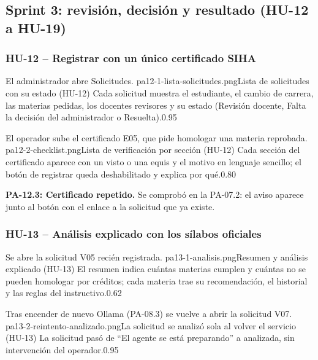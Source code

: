 \clearpage
\subsection{Sprint 3: revisión, decisión y resultado (HU-12 a HU-19)}

\subsubsection{HU-12 -- Registrar con un único certificado SIHA}

{El administrador abre Solicitudes.}
{pa12-1-lista-solicitudes.png}{Lista de solicitudes con su estado (HU-12)}
{Cada solicitud muestra el estudiante, el cambio de carrera, las materias pedidas, los docentes revisores y su estado
(Revisión docente, Falta la decisión del administrador o Resuelta).}{0.95}

{El operador sube el certificado E05, que pide homologar una materia reprobada.}
{pa12-2-checklist.png}{Lista de verificación por sección (HU-12)}
{Cada sección del certificado aparece con un visto o una equis y el motivo en lenguaje sencillo; el botón de registrar
queda deshabilitado y explica por qué.}{0.80}

\textbf{PA-12.3: Certificado repetido.} Se comprobó en la PA-07.2: el aviso aparece junto al botón con el enlace a la
solicitud que ya existe.

\subsubsection{HU-13 -- Análisis explicado con los sílabos oficiales}

{Se abre la solicitud V05 recién registrada.}
{pa13-1-analisis.png}{Resumen y análisis explicado (HU-13)}
{El resumen indica cuántas materias cumplen y cuántas no se pueden homologar por créditos; cada materia trae su
recomendación, el historial y las reglas del instructivo.}{0.62}

{Tras encender de nuevo Ollama (PA-08.3) se vuelve a abrir la solicitud V07.}
{pa13-2-reintento-analizado.png}{La solicitud se analizó sola al volver el servicio (HU-13)}
{La solicitud pasó de ``El agente se está preparando'' a analizada, sin intervención del operador.}{0.95}

